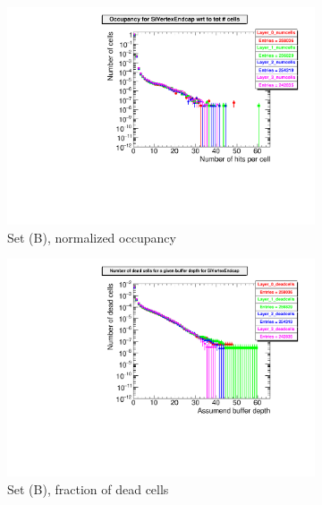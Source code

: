   \begin{figure}[htb]\ContinuedFloat
     \begin{subfigure}[b]{0.49\textwidth}
   \centering
    \includegraphics[width=\textwidth]{Figures/Pairs/Appendix/occupancy_numcells_SiVertexEndcap_ILC250_SetB.pdf}
   \caption{Set (B), normalized occupancy}
   \end{subfigure}
   \hfill
    \begin{subfigure}[b]{0.49\textwidth}
   \centering
    \includegraphics[width=\textwidth]{Figures/Pairs/Appendix/occupancy_deadcells_SiVertexEndcap_ILC250_SetB.pdf}
   \caption{Set (B), fraction of dead cells}
   \end{subfigure}\\
     \begin{subfigure}[b]{0.49\textwidth}

\end{subfigure}
\end{figure}
